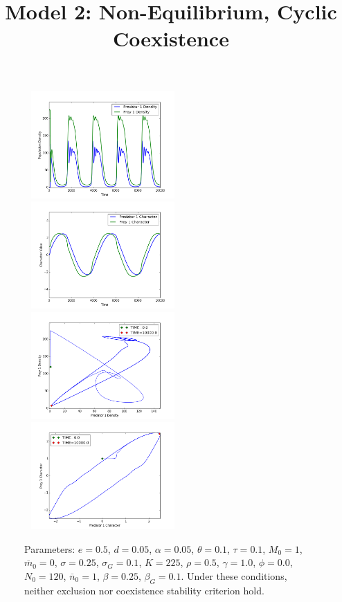 \documentclass{amsart}
\theoremstyle{definition}
\theoremstyle{remark}
\numberwithin{equation}{section}
\begin{document}
\begin{centering}
\begin{figure}
		\label{fig:variable_growth_coexistence_equilibrium}
	\end{figure}
	\begin{figure}
		\title{\bf Model 2: Non-Equilibrium, Cyclic Coexistence\\}
		\includegraphics[width=6cm,height=4.1cm]{figures/1x1/variable_growth/stable_cycles/densities.png}
		\includegraphics[width=6cm,height=4.1cm]{figures/1x1/variable_growth/stable_cycles/traits.png}
		\includegraphics[width=6cm,height=4.1cm]{figures/1x1/variable_growth/stable_cycles/density_phase_plane.png}
		\includegraphics[width=6cm,height=4.1cm]{figures/1x1/variable_growth/stable_cycles/trait_phase_plane.png}
		\caption{\footnotesize Parameters: $e = 0.5$, $d = 0.05$, $\alpha = 0.05$, $\theta = 0.1$, $\tau = 0.1$, $M_0 = 1$, $\overline{m}_0 = 0$, $\sigma = 0.25$, $\sigma_G = 0.1$, $K = 225$, $\rho = 0.5$, $\gamma = 1.0$, $\phi = 0.0$, $N_0 = 120$, $\overline{n}_0 = 1$, $\beta = 0.25$, $\beta_G = 0.1$.  Under these conditions, neither exclusion nor coexistence stability criterion hold.}
		\label{fig:variable_growth_stable_cycles}
	\end{figure}
\end{centering}
\end{document}

